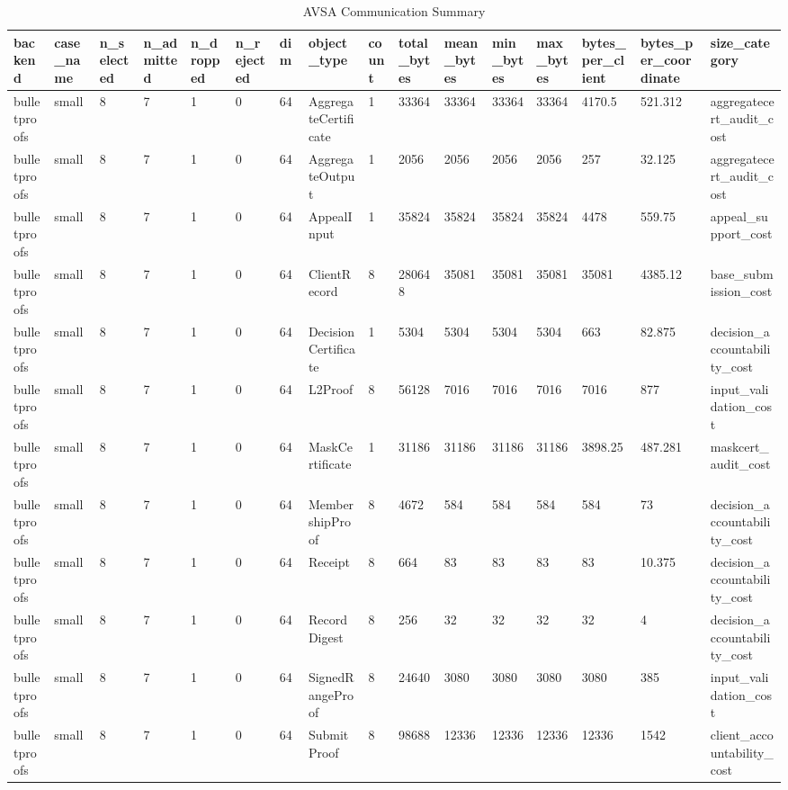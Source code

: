 \begin{table}[t]
\centering
\small
\caption{AVSA Communication Summary}
\begin{tabular}{llllllllllllllll}
\toprule
backend & case\_name & n\_selected & n\_admitted & n\_dropped & n\_rejected & dim & object\_type & count & total\_bytes & mean\_bytes & min\_bytes & max\_bytes & bytes\_per\_client & bytes\_per\_coordinate & size\_category \\
\midrule
bulletproofs & small & 8 & 7 & 1 & 0 & 64 & AggregateCertificate & 1 & 33364 & 33364 & 33364 & 33364 & 4170.5 & 521.312 & aggregatecert\_audit\_cost \\
bulletproofs & small & 8 & 7 & 1 & 0 & 64 & AggregateOutput & 1 & 2056 & 2056 & 2056 & 2056 & 257 & 32.125 & aggregatecert\_audit\_cost \\
bulletproofs & small & 8 & 7 & 1 & 0 & 64 & AppealInput & 1 & 35824 & 35824 & 35824 & 35824 & 4478 & 559.75 & appeal\_support\_cost \\
bulletproofs & small & 8 & 7 & 1 & 0 & 64 & ClientRecord & 8 & 280648 & 35081 & 35081 & 35081 & 35081 & 4385.12 & base\_submission\_cost \\
bulletproofs & small & 8 & 7 & 1 & 0 & 64 & DecisionCertificate & 1 & 5304 & 5304 & 5304 & 5304 & 663 & 82.875 & decision\_accountability\_cost \\
bulletproofs & small & 8 & 7 & 1 & 0 & 64 & L2Proof & 8 & 56128 & 7016 & 7016 & 7016 & 7016 & 877 & input\_validation\_cost \\
bulletproofs & small & 8 & 7 & 1 & 0 & 64 & MaskCertificate & 1 & 31186 & 31186 & 31186 & 31186 & 3898.25 & 487.281 & maskcert\_audit\_cost \\
bulletproofs & small & 8 & 7 & 1 & 0 & 64 & MembershipProof & 8 & 4672 & 584 & 584 & 584 & 584 & 73 & decision\_accountability\_cost \\
bulletproofs & small & 8 & 7 & 1 & 0 & 64 & Receipt & 8 & 664 & 83 & 83 & 83 & 83 & 10.375 & decision\_accountability\_cost \\
bulletproofs & small & 8 & 7 & 1 & 0 & 64 & RecordDigest & 8 & 256 & 32 & 32 & 32 & 32 & 4 & decision\_accountability\_cost \\
bulletproofs & small & 8 & 7 & 1 & 0 & 64 & SignedRangeProof & 8 & 24640 & 3080 & 3080 & 3080 & 3080 & 385 & input\_validation\_cost \\
bulletproofs & small & 8 & 7 & 1 & 0 & 64 & SubmitProof & 8 & 98688 & 12336 & 12336 & 12336 & 12336 & 1542 & client\_accountability\_cost \\

\end{tabular}
\end{table}
